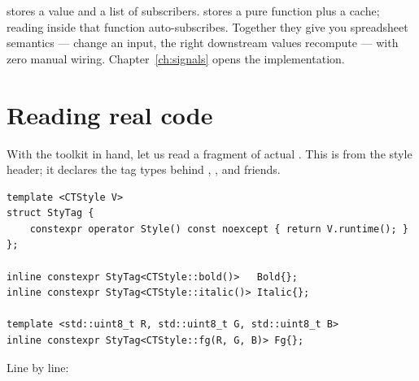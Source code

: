 \begin{idea}
 stores a value and a list of subscribers.
 stores a pure function plus a cache; reading inside
that function auto-subscribes. Together they give you spreadsheet
semantics --- change an input, the right downstream values
recompute --- with zero manual wiring. Chapter~\ref{ch:signals}
opens the implementation.
\end{idea}

\section{Reading real \maya{} code}
\label{sec:cpp:reading}

With the toolkit in hand, let us read a fragment of actual \maya{}.
This is from the style header; it declares the tag types behind
, , and friends.

\begin{lstlisting}
template <CTStyle V>
struct StyTag {
    constexpr operator Style() const noexcept { return V.runtime(); }
};

inline constexpr StyTag<CTStyle::bold()>   Bold{};
inline constexpr StyTag<CTStyle::italic()> Italic{};

template <std::uint8_t R, std::uint8_t G, std::uint8_t B>
inline constexpr StyTag<CTStyle::fg(R, G, B)> Fg{};
\end{lstlisting}

Line by line:

